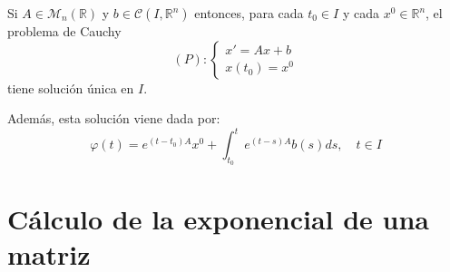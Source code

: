 \begin{corollary}
    Si $A \in \mathcal{M}_n(\mathbb{R})$ y $b \in \mathcal{C}(I, \mathbb{R}^n)$ entonces, para cada $t_0 \in I$ y cada $x^0 \in \mathbb{R}^n$, el problema de Cauchy
    $$(P): \begin{cases}
            x' = Ax + b \\
            x(t_0) = x^0
        \end{cases}$$
    tiene solución única en $I$.

    Además, esta solución viene dada por:
    $$\varphi(t) = e^{(t-t_0)A}x^0 + \int_{t_0}^t e^{(t-s)A}b(s)ds, \quad t \in I$$
\end{corollary}

\section{Cálculo de la exponencial de una matriz}
